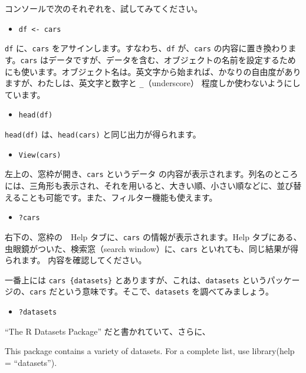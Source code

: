 \documentclass[
]{bxjsbook}
\providecommand{\tightlist}{%
  \setlength{\itemsep}{0pt}\setlength{\parskip}{0pt}}
\theoremstyle{definition}
\theoremstyle{definition}
\theoremstyle{definition}
\theoremstyle{definition}
\theoremstyle{remark}
\begin{document}
コンソールで次のそれぞれを、試してみてください。

\begin{itemize}
\tightlist
\item
  \texttt{df\ \textless{}-\ cars}
\end{itemize}

\texttt{df} に、\texttt{cars} をアサインします。すなわち、\texttt{df} が、\texttt{cars} の内容に置き換わります。\texttt{cars} はデータですが、データを含む、オブジェクトの名前を設定するためにも使います。オブジェクト名は。英文字から始まれば、かなりの自由度がありますが、わたしは、英文字と数字と \texttt{\_}（underscore） 程度しか使わないようにしています。

\begin{itemize}
\tightlist
\item
  \texttt{head(df)}
\end{itemize}

\texttt{head(df)} は、\texttt{head(cars)} と同じ出力が得られます。

\begin{itemize}
\tightlist
\item
  \texttt{View(cars)}
\end{itemize}

左上の、窓枠が開き、\texttt{cars} というデータ の内容が表示されます。列名のところには、三角形も表示され、それを用いると、大きい順、小さい順などに、並び替えることも可能です。また、フィルター機能も使えます。

\begin{itemize}
\tightlist
\item
  \texttt{?cars}
\end{itemize}

右下の、窓枠の　Help タブに、\texttt{cars} の情報が表示されます。Help タブにある、虫眼鏡がついた、検索窓（search window）に、\texttt{cars} といれても、同じ結果が得られます。
内容を確認してください。

一番上には \texttt{cars\ \{datasets\}} とありますが、これは、\texttt{datasets} というパッケージの、\texttt{cars} だという意味です。そこで、\texttt{datasets} を調べてみましょう。

\begin{itemize}
\tightlist
\item
  \texttt{?datasets}
\end{itemize}

``The R Datasets Package'' だと書かれていて、さらに、

This package contains a variety of datasets. For a complete list, use library(help = ``datasets'').
\end{document}
